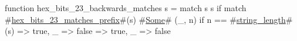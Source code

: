function hex_bits_23_backwards_matches s = match s {
  s if match #\hyperref[sailRISCVzhexzybitszy23zymatcheszyprefix]{hex\_bits\_23\_matches\_prefix}#(s) {
    #\hyperref[sailRISCVzSome]{Some}# (_, n) if n == #\hyperref[sailRISCVzstringzylength]{string\_length}#(s) => true,
    _ => false
  } => true,
  _ => false
}
